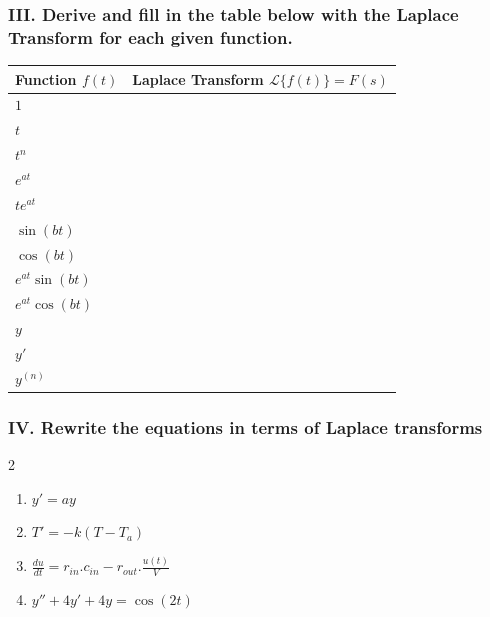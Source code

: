 \documentclass[12pt]{article}
\begin{document}
\pagebreak

\subsubsection*{III. Derive and fill in the table below with the Laplace Transform for each given function.
}


\begin{table}[h!]
    \centering
    \renewcommand{\arraystretch}{1.5}
    \setlength{\tabcolsep}{12pt}
    \begin{tabular}{|>{\centering\arraybackslash}m{3cm}|>{\centering\arraybackslash}m{6cm}|}
        \hline
        \textbf{Function} \(f(t)\) & \textbf{Laplace Transform} \(\mathcal{L}\{f(t)\} = F(s)\) \\
        \hline
        \(1\) &  \\ \hline
        \(t\) &  \\ \hline
        \(t^n\) &  \\ \hline
        \(e^{at}\) &  \\ \hline
        \(te^{at}\) &  \\ \hline
        \(\sin(bt)\) &  \\ \hline
        \(\cos(bt)\) &  \\ \hline
        \(e^{at} \sin(bt)\) &  \\ \hline
        \(e^{at} \cos(bt)\) &  \\ \hline
        \(y\) &  \\ \hline
        \(y'\) &  \\ \hline
        \(y^{(n)}\) &  \\ \hline
    \end{tabular}
    \label{tab:laplace-transform}
\end{table}




\subsubsection*{IV. Rewrite the equations in terms of Laplace transforms }

\begin{multicols}{2}
\begin{enumerate}
    \item $\displaystyle  y' = ay$
    \item $\displaystyle  T' = -k(T-T_a)$
    \item $\displaystyle \frac{du}{dt}= r_{in}.c_{in} - r_{out}.\frac{u(t)}{V} $ 
    \item $\displaystyle y'' + 4y' + 4y = \cos(2t)$
    

\end{enumerate}
\end{multicols}
\end{document}
